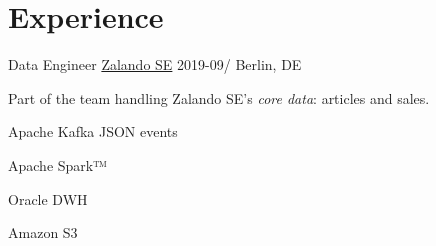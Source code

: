 \documentclass[10pt,letterpaper]{article}%
\begin{document}
\noindent%
\begin{minipage}[t]{0.575\textwidth}
  \section{Experience}%
  \label{sec:experience}
  \WorkEntry%
  {Data Engineer}%
  {\href{https://corporate.zalando.com/en}{Zalando SE}}%
  {2019-09/}%
  {Berlin, DE}%
  {%
    Part of the team handling Zalando SE’s \emph{core data}: articles and
    sales.%
    \medskip%
    \newline%
    \begin{adjustbox}{valign=m,minipage=.25\linewidth}
      \begin{tcolorbox}[title=Nakadi,remember as=Kafka,width=\linewidth]
        Apache Kafka%
        \tcblower%
        JSON events
      \end{tcolorbox}
    \end{adjustbox}%
    \hfill%
    \begin{adjustbox}{valign=m,minipage=.25\linewidth,margin=0 0 0 14pt}
      \begin{tcolorbox}[title=Databricks,remember as=Spark,width=\linewidth]
        Apache Spark™
      \end{tcolorbox}%
    \end{adjustbox}%
    \hfill%
    \begin{adjustbox}{valign=m,minipage=.2\linewidth}
      \begin{tcolorbox}[remember as=Oracle,width=\linewidth]
        Oracle DWH
      \end{tcolorbox}%
      \newline%
      \begin{tcolorbox}[remember as=S3,width=\linewidth]
        Amazon S3
      \end{tcolorbox}%
    \end{adjustbox}%
    \hfill%
    \begin{adjustbox}{valign=m,minipage=.15\linewidth,margin=0 0 0 14pt}

\end{adjustbox}}
\end{minipage}
\end{document}

